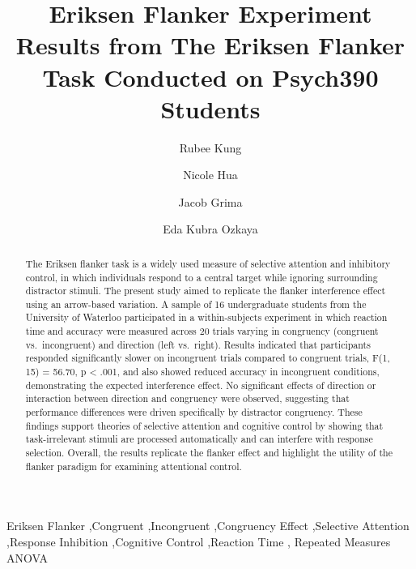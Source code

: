 \documentclass[
  authoryear,
  preprint]{elsarticle}
\begin{document}
\begin{frontmatter}
\title{Eriksen Flanker Experiment \\\large{Results from The Eriksen
Flanker Task Conducted on Psych390 Students} }
\author[1]{Rubee Kung%
%
}
\author[1]{Nicole Hua%
%
}
\author[1]{Jacob Grima%
%
}
\author[1]{Eda Kubra Ozkaya%
%
}






        
\begin{abstract}
The Eriksen flanker task is a widely used measure of selective attention
and inhibitory control, in which individuals respond to a central target
while ignoring surrounding distractor stimuli. The present study aimed
to replicate the flanker interference effect using an arrow-based
variation. A sample of 16 undergraduate students from the University of
Waterloo participated in a within-subjects experiment in which reaction
time and accuracy were measured across 20 trials varying in congruency
(congruent vs.~incongruent) and direction (left vs.~right). Results
indicated that participants responded significantly slower on
incongruent trials compared to congruent trials, F(1, 15) = 56.70, p
\textless{} .001, and also showed reduced accuracy in incongruent
conditions, demonstrating the expected interference effect. No
significant effects of direction or interaction between direction and
congruency were observed, suggesting that performance differences were
driven specifically by distractor congruency. These findings support
theories of selective attention and cognitive control by showing that
task-irrelevant stimuli are processed automatically and can interfere
with response selection. Overall, the results replicate the flanker
effect and highlight the utility of the flanker paradigm for examining
attentional control.
\end{abstract}





\begin{keyword}
    Eriksen Flanker \sep Congruent \sep Incongruent \sep Congruency
Effect \sep Selective Attention \sep Response Inhibition \sep Cognitive
Control \sep Reaction Time \sep 
    Repeated Measures ANOVA
\end{keyword}
\end{frontmatter}
    
\end{document}
